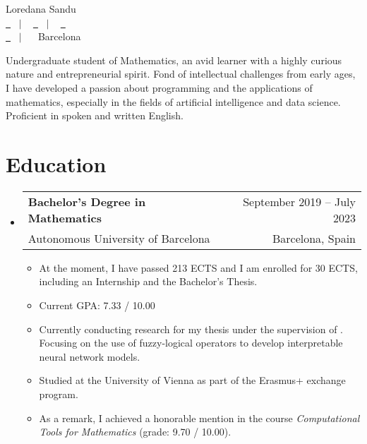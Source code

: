 \documentclass[a4paper,11pt]{article}
\makeatletter
\newcommand{\resumeQuadHeading}[4]{
  \item
  \begin{tabular*}{0.96\textwidth}[t]{l@{\extracolsep{\fill}}r}
    \textbf{#1} & \small #2 \\
    \small#3 & \small #4 \\
  \end{tabular*}
}
\newcommand{\resumeHeadingListStart}{
  \begin{itemize}[leftmargin=0.15in, label={}]
}
\newcommand{\resumeHeadingListEnd}{\end{itemize}}
\makeatother
\begin{document}
\begin{center}
    {\Huge Loredana Sandu \vspace{2pt}} \\[1.25pc]
    \href{https://loredanasandu.com}{\faLink \ } \ $|$ \ %
    \href{https://www.linkedin.com/in/loredana-sandu/}{\faLinkedinSquare \ } \ $|$ \ %
    \href{https://www.github.com/loredanasandu}{\faGithub \ } \\[0.1pc] %
    \href{mailto:loredana@loredanasandu.com}{\faEnvelope \ } \ $|$ \ %
    \faHome \ Barcelona \\[1.5pc] %
\end{center}

\begin{justify}
    Undergraduate student of Mathematics, an avid learner with a highly curious nature and entrepreneurial spirit. Fond of intellectual challenges from early ages, I have developed a passion about programming and the applications of mathematics, especially in the fields of artificial intelligence and data science. Proficient in spoken and written English.
\end{justify}



\section{Education}
    \resumeHeadingListStart{}
      \resumeQuadHeading{Bachelor's Degree in Mathematics}{September 2019 – July 2023}
      {Autonomous University of Barcelona}{Barcelona, Spain}
      \begin{itemize}[leftmargin=3em, itemsep=0.1em, topsep=2pt]
          \item \small At the moment, I have passed 213 ECTS and I am enrolled for 30 ECTS, including an Internship and the Bachelor's Thesis.
          \item \small Current GPA: 7.33 / 10.00
          \item \small Currently conducting research for my thesis under the supervision of \href{https://www.uab.cat/web/el-departament/pilar-dellunde-1260171823608.html}{}. Focusing on the use of fuzzy-logical operators to develop interpretable neural network models.
          \item \small Studied at the University of Vienna as part of the Erasmus+ exchange program.
          \item \small As a remark, I achieved a honorable mention in the course \textit{Computational Tools for Mathematics} (grade: 9.70 / 10.00). 
      \end{itemize}
    \resumeHeadingListEnd{}
\end{document}
